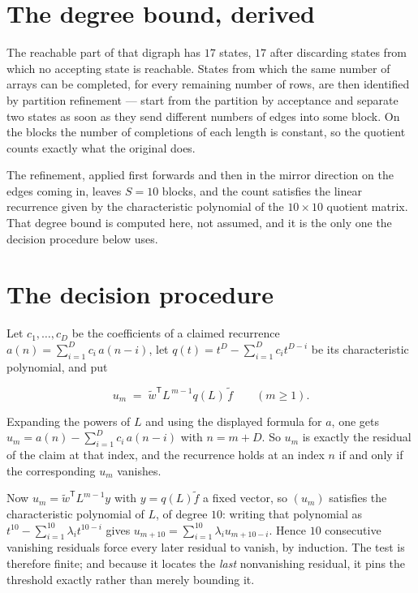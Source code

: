 \documentclass[11pt]{article}
\theoremstyle{definition}
\begin{document}
\section{The degree bound, derived}

The reachable part of that digraph has $17$ states, $17$ after discarding states from which no accepting state is reachable. States from which the same number of arrays can be completed, for every remaining number of rows, are then identified by partition refinement --- start from the partition by acceptance and separate two states as soon as they send different numbers of edges into some block. On the blocks the number of completions of each length is constant, so the quotient counts exactly what the original does.

The refinement, applied first forwards and then in the mirror direction on the edges coming in, leaves $S = 10$ blocks, and the count satisfies the linear recurrence given by the characteristic polynomial of the $10 \times 10$ quotient matrix. That degree bound is computed here, not assumed, and it is the only one the decision procedure below uses.

\section{The decision procedure}

Let $c_1,\dots,c_D$ be the coefficients of a claimed recurrence $a(n) = \sum_{i=1}^{D} c_i\,a(n-i)$, let $q(t) = t^{D} - \sum_{i=1}^{D} c_i t^{D-i}$ be its characteristic polynomial, and put

\[u_m \;=\; \tilde w^{\mathsf T} L^{\,m-1} q(L)\,\tilde f \qquad (m \ge 1).\]

Expanding the powers of $L$ and using the displayed formula for $a$, one gets $u_m = a(n) - \sum_{i=1}^{D} c_i\,a(n-i)$ with $n = m + D$. So $u_m$ is exactly the residual of the claim at that index, and the recurrence holds at an index $n$ if and only if the corresponding $u_m$ vanishes.

Now $u_m = \tilde w^{\mathsf T} L^{m-1} y$ with $y = q(L)\tilde f$ a fixed vector, so $(u_m)$ satisfies the characteristic polynomial of $L$, of degree $10$: writing that polynomial as $t^{10} - \sum_{i=1}^{10} \lambda_i t^{10-i}$ gives $u_{m+10} = \sum_{i=1}^{10} \lambda_i u_{m+10-i}$. Hence $10$ consecutive vanishing residuals force every later residual to vanish, by induction. The test is therefore finite; and because it locates the {\itshape last} nonvanishing residual, it pins the threshold exactly rather than merely bounding it.
\end{document}
